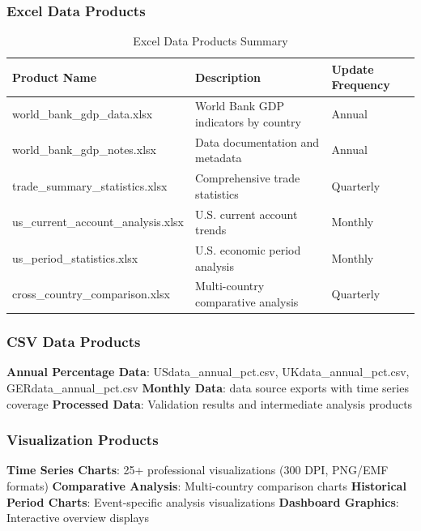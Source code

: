 \documentclass[11pt,a4paper]{article}
\begin{document}
\subsubsection{Excel Data Products}
\begin{table}[h]
\centering
\caption{Excel Data Products Summary}
\begin{tabular}{lll}
\toprule
\textbf{Product Name} & \textbf{Description} & \textbf{Update Frequency} \\
\midrule
world\_bank\_gdp\_data.xlsx & World Bank GDP indicators by country & Annual \\
world\_bank\_gdp\_notes.xlsx & Data documentation and metadata & Annual \\
trade\_summary\_statistics.xlsx & Comprehensive trade statistics & Quarterly \\
us\_current\_account\_analysis.xlsx & U.S. current account trends & Monthly \\
us\_period\_statistics.xlsx & U.S. economic period analysis & Monthly \\
cross\_country\_comparison.xlsx & Multi-country comparative analysis & Quarterly \\
\bottomrule
\end{tabular}
\end{table}

\subsubsection{CSV Data Products}
\begin{itemize}
    \textbf{Annual Percentage Data}: USdata\_annual\_pct.csv, UKdata\_annual\_pct.csv, GERdata\_annual\_pct.csv
    \textbf{Monthly Data}: data source exports with time series coverage
    \textbf{Processed Data}: Validation results and intermediate analysis products
\end{itemize}

\subsubsection{Visualization Products}
\begin{itemize}
    \textbf{Time Series Charts}: 25+ professional visualizations (300 DPI, PNG/EMF formats)
    \textbf{Comparative Analysis}: Multi-country comparison charts
    \textbf{Historical Period Charts}: Event-specific analysis visualizations
    \textbf{Dashboard Graphics}: Interactive overview displays
\end{itemize}
\end{document}
